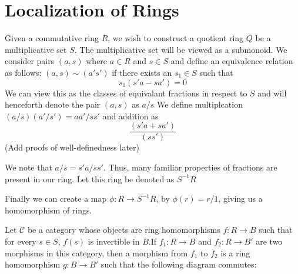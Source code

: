 \documentclass[main.tex]{subfiles}
\begin{document}
 
\section{Localization of Rings}

Given a commutative ring $R$, we wish to construct a quotient ring $Q$ be a multiplicative set $S$. The multiplicative set will be viewed as a submonoid.
We consider pairs $(a,s)$ where $a \in R$ and $s \in S$ and define an equivalence relation as follows: 
$(a,s) \sim (a's') $ if there exists an $s_1 \in S$ such that $$s_1(s'a - sa') = 0$$
We can view this as the classes of equivalant fractions in respect to $S$ and will henceforth denote the pair $(a,s)$ as $a/s$
We define multiplcation $(a/s)(a'/s') = aa'/ss'$ and addition as $$\frac{(s'a + sa')}{(ss')}$$
(Add proofs of well-definedness later)

We note that $a/s = s'a/ss'$. Thus, many familiar properties of fractions are present in our ring. Let this ring be denoted as $S^{-1}R$


Finally we can create a map $\phi: R \rightarrow S^{-1}R$, by $\phi(r) = r/1$, giving us a homomorphism of rings. 

Let $\mathcal{C}$ be a category whose objects are ring homomorphisms $f:R \rightarrow B$ such that for every $s \in S$, $f(s)$ is invertible in $B$.If $f_1: R \rightarrow B$ and $f_2:R \rightarrow B'$ are two morphisms in this category, then a morphism from $f_1$ to $f_2$ is a ring homomorphism $g: B \rightarrow B'$ such that the following diagram commutes:

\end{document}
